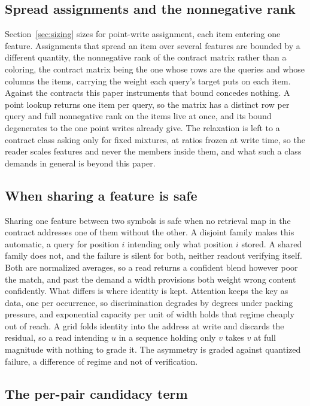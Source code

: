 \subsection{Spread assignments and the nonnegative rank}
\label{apd:nonneg}

Section~\ref{sec:sizing} sizes for point-write assignment, each item entering one feature. Assignments that spread an item over several features are bounded by a different quantity, the nonnegative rank of the contract matrix rather than a coloring, the contract matrix being the one whose rows are the queries and whose columns the items, carrying the weight each query's target puts on each item. Against the contracts this paper instruments that bound concedes nothing. A point lookup returns one item per query, so the matrix has a distinct row per query and full nonnegative rank on the items live at once, and its bound degenerates to the one point writes already give. The relaxation is left to a contract class asking only for fixed mixtures, at ratios frozen at write time, so the reader scales features and never the members inside them, and what such a class demands in general is beyond this paper.

\subsection{When sharing a feature is safe}
\label{apd:sharing}

Sharing one feature between two symbols is safe when no retrieval map in the contract addresses one of them without the other. A disjoint family makes this automatic, a query for position $i$ intending only what position $i$ stored. A shared family does not, and the failure is silent for both, neither readout verifying itself. Both are normalized averages, so a read returns a confident blend however poor the match, and past the demand a width provisions both weight wrong content confidently. What differs is where identity is kept. Attention keeps the key as data, one per occurrence, so discrimination degrades by degrees under packing pressure, and exponential capacity per unit of width holds that regime cheaply out of reach. A grid folds identity into the address at write and discards the residual, so a read intending $u$ in a sequence holding only $v$ takes $v$ at full magnitude with nothing to grade it. The asymmetry is graded against quantized failure, a difference of regime and not of verification.

\subsection{The per-pair candidacy term}
\label{apd:quanta}

